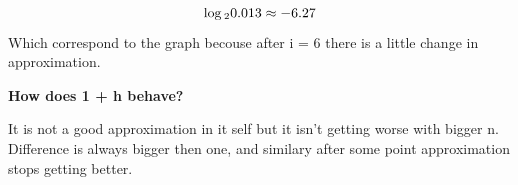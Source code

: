 \documentclass{article}
\begin{document}
\[
    \log\textsubscript{2}{0.013} \approx -6.27
\]
Which correspond to the graph becouse after i = 6 there is a little change in approximation.
\begin{center}
    \textbf{How does 1 + h behave?}
\end{center}
It is not a good approximation in it self but it isn't getting worse with bigger n. Difference is always bigger then one, and similary after some point approximation stops getting better.
\end{document}
